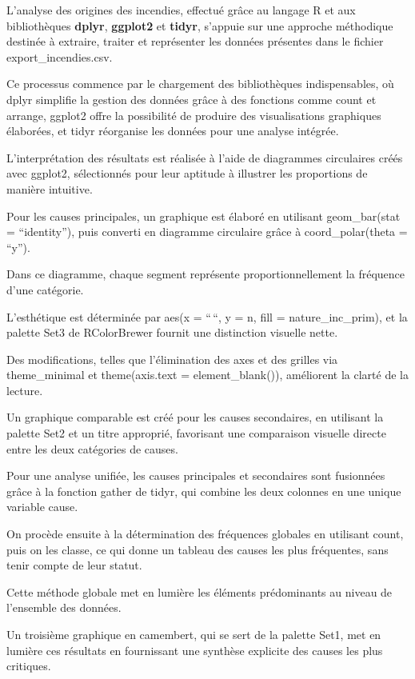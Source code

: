 \documentclass[
]{article}
\begin{document}
L'analyse des origines des incendies, effectué grâce au langage R et aux
bibliothèques \textbf{dplyr}, \textbf{ggplot2} et \textbf{tidyr},
s'appuie sur une approche méthodique destinée à extraire, traiter et
représenter les données présentes dans le fichier export\_incendies.csv.

Ce processus commence par le chargement des bibliothèques
indispensables, où dplyr simplifie la gestion des données grâce à des
fonctions comme count et arrange, ggplot2 offre la possibilité de
produire des visualisations graphiques élaborées, et tidyr réorganise
les données pour une analyse intégrée.

L'interprétation des résultats est réalisée à l'aide de diagrammes
circulaires créés avec ggplot2, sélectionnés pour leur aptitude à
illustrer les proportions de manière intuitive.

Pour les causes principales, un graphique est élaboré en utilisant
geom\_bar(stat = ``identity''), puis converti en diagramme circulaire
grâce à coord\_polar(theta = ``y'').

Dans ce diagramme, chaque segment représente proportionnellement la
fréquence d'une catégorie.

L'esthétique est déterminée par aes(x = ``\,``, y = n, fill =
nature\_inc\_prim), et la palette Set3 de RColorBrewer fournit une
distinction visuelle nette.

Des modifications, telles que l'élimination des axes et des grilles via
theme\_minimal et theme(axis.text = element\_blank()), améliorent la
clarté de la lecture.

Un graphique comparable est créé pour les causes secondaires, en
utilisant la palette Set2 et un titre approprié, favorisant une
comparaison visuelle directe entre les deux catégories de causes.

Pour une analyse unifiée, les causes principales et secondaires sont
fusionnées grâce à la fonction gather de tidyr, qui combine les deux
colonnes en une unique variable cause.

On procède ensuite à la détermination des fréquences globales en
utilisant count, puis on les classe, ce qui donne un tableau des causes
les plus fréquentes, sans tenir compte de leur statut.

Cette méthode globale met en lumière les éléments prédominants au niveau
de l'ensemble des données.

Un troisième graphique en camembert, qui se sert de la palette Set1, met
en lumière ces résultats en fournissant une synthèse explicite des
causes les plus critiques.
\end{document}
